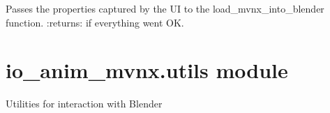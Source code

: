 \documentclass[letterpaper,10pt,english,openany,oneside]{sphinxmanual}
\begin{document}
\begin{fulllineitems}

\begin{fulllineitems}
\label{\detokenize{io_anim_mvnx:io_anim_mvnx.operators.ImportMVNX.execute}}
Passes the properties captured by the UI to the load\_mvnx\_into\_blender
function.
:returns:  if everything went OK.

\end{fulllineitems}


\end{fulllineitems}



\section{io\_anim\_mvnx.utils module}
\label{\detokenize{io_anim_mvnx:module-io_anim_mvnx.utils}}\label{\detokenize{io_anim_mvnx:io-anim-mvnx-utils-module}}
Utilities for interaction with Blender
\end{document}
